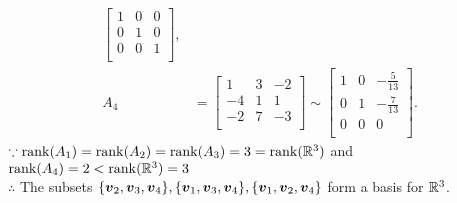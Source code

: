 \documentclass{report}
\begin{document}
{\[\begin{align*}
\begin{bmatrix}
                                           1 & 0 & 0 \\
                                           0 & 1 & 0 \\
                                           0 & 0 & 1 \\
                                       \end{bmatrix},         \\[0.5em]
            A_4 & = \begin{bmatrix}
                        1  & 3 & -2 \\
                        -4 & 1 & 1  \\
                        -2 & 7 & -3 \\
                    \end{bmatrix} \sim \begin{bmatrix}
                                           1 & 0 & - \frac{5}{13} \\
                                           0 & 1 & - \frac{7}{13} \\
                                           0 & 0 & 0              \\
                                       \end{bmatrix}.
        \end{align*}
    \]
    \( \because \mathrm{rank}(A_1) = \mathrm{rank}(A_2) = \mathrm{rank}(A_3) = 3 = \mathrm{rank}(\RR[3]) \) and \( \mathrm{rank}(A_4) = 2 < \mathrm{rank}(\RR[3]) = 3 \) \\
    \( \therefore \) The subsets \( \{ \boldsymbol{v}_2, \boldsymbol{v}_3, \boldsymbol{v}_4 \}, \{ \boldsymbol{v}_1, \boldsymbol{v}_3, \boldsymbol{v}_4 \}, \{ \boldsymbol{v}_1, \boldsymbol{v}_2, \boldsymbol{v}_4 \} \) form a basis for \( \RR[3] \). \\
}


\end{document}
